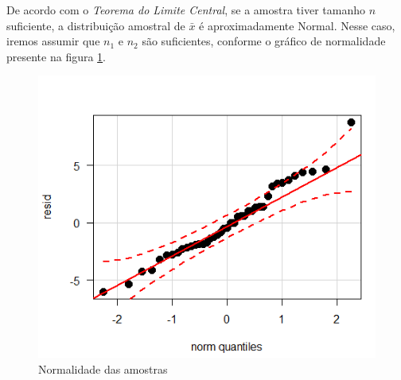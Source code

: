 \documentclass[12pt, a4paper]{article}
\begin{document}
\par De acordo com o \textit{Teorema do Limite Central}, se a amostra tiver tamanho $n$ suficiente, a distribuição amostral de $\bar{x}$ é aproximadamente Normal. Nesse caso, iremos assumir que $n_{1}$ e $n_{2}$ são suficientes, conforme o gráfico de normalidade presente na figura \ref{fig:normal}.
\begin{figure}[h]
\centering
\includegraphics{img/plot-normalidade.png}
\caption{Normalidade das amostras}
\label{fig:normal}
\end{figure}
\end{document}
